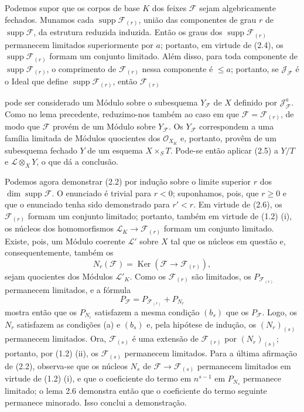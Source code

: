 \documentclass[11pt,twoside,openany]{book}
\numberwithin{equation}{section}
\newcommand{\src}[1]{%
  \phantomsection\hypertarget{src:#1}{}%
  \marginpar{\raggedleft\footnotesize\sffamily #1}%
}
\theoremstyle{plain}
\theoremstyle{definition}
\theoremstyle{remark}
\newcommand{\FgaUnitKey}{frontmatter}
\renewcommand{\src}[1]{%
  \phantomsection\hypertarget{src:\FgaUnitKey:#1}{}%
  \marginpar{\raggedleft\footnotesize\sffamily #1}%
}
\begin{document}
Podemos supor que os corpos de base $K$ dos feixes $\mathcal F$ sejam
algebricamente fechados. Munamos cada
$\operatorname{supp}\mathcal F_{(r)}$, união das componentes de grau
$r$ de
$\operatorname{supp}\mathcal F$, da estrutura reduzida induzida. Então os graus dos
$\operatorname{supp}\mathcal F_{(r)}$ permanecem limitados superiormente por
$a$; portanto, em virtude de (2.4), os
$\operatorname{supp}\mathcal F_{(r)}$ formam um conjunto limitado. Além disso,
para toda componente de $\operatorname{supp}\mathcal F_{(r)}$, o comprimento de
$\mathcal F_{(r)}$ nessa componente é $\leq a$; portanto, se
$\mathcal J_{\mathcal F}$ é o Ideal que define
$\operatorname{supp}\mathcal F_{(r)}$, então $\mathcal F_{(r)}$
\src{258}
pode ser considerado um Módulo sobre o subesquema $Y_{\mathcal F}$ de $X$
definido por $\mathcal J_{\mathcal F}^{a}$. Como no lema precedente, reduzimo-nos também
ao caso em que $\mathcal F=\mathcal F_{(r)}$, de modo que $\mathcal F$
provém de um Módulo sobre $Y_{\mathcal F}$. Os $Y_{\mathcal F}$ correspondem
a uma família limitada de Módulos quocientes dos $\mathcal O_{X_K}$ e,
portanto, provêm de um subesquema fechado $Y$ de um esquema $X\times_S T$.
Pode-se então aplicar (2.5) a $Y/T$ e $\mathcal L\otimes_XY$, o que dá a
conclusão.

Podemos agora demonstrar (2.2) por indução sobre o limite superior $r$ dos
$\dim\operatorname{supp}\mathcal F$. O enunciado é trivial para $r<0$;
suponhamos, pois, que $r\geq0$ e que o enunciado tenha sido demonstrado para
$r'<r$. Em virtude de (2.6), os $\mathcal F_{(r)}$ formam um conjunto
limitado; portanto, também em virtude de (1.2) (i), os núcleos dos
homomorfismos $\mathcal L_K\longrightarrow\mathcal F_{(r)}$ formam um
conjunto limitado. Existe, pois, um Módulo coerente $\mathcal L'$ sobre $X$
tal que os núcleos em questão e, consequentemente, também os
\[
N_r(\mathcal F)=\operatorname{Ker}(\mathcal F\longrightarrow\mathcal F_{(r)}),
\]
sejam quocientes dos Módulos $\mathcal L'_K$. Como os $\mathcal F_{(r)}$ são
limitados, os $P_{\mathcal F_{(r)}}$ permanecem limitados, e a fórmula
\[
P_{\mathcal F}=P_{\mathcal F_{(r)}}+P_{N_r}
\]
mostra então que os $P_{N_r}$ satisfazem a mesma condição $(b_s)$ que os
$P_{\mathcal F}$. Logo, os $N_r$ satisfazem as condições (a) e $(b_s)$ e,
pela hipótese de indução, os $(N_r)_{(s)}$ permanecem limitados. Ora,
$\mathcal F_{(s)}$ é uma extensão de $\mathcal F_{(r)}$ por
$(N_r)_{(s)}$; portanto, por (1.2) (ii), os $\mathcal F_{(s)}$ permanecem
limitados. Para a última afirmação de (2.2), observa-se que os núcleos $N_s$ de
$\mathcal F\longrightarrow\mathcal F_{(s)}$ permanecem limitados em virtude
de (1.2) (i), e que o coeficiente do termo em $n^{s-1}$ em $P_{N_s}$ permanece
limitado; o lema 2.6 demonstra então que o coeficiente do termo seguinte
permanece minorado. Isso conclui a demonstração.
\end{document}
